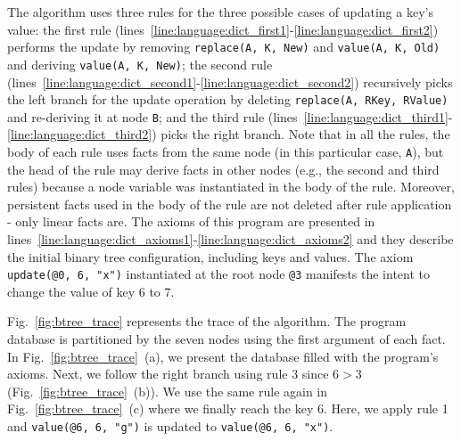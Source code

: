 The algorithm uses three rules for the three possible cases of updating a key's
value: the first rule
(lines~\ref{line:language:dict_first1}-\ref{line:language:dict_first2}) performs
the update by removing \texttt{replace(A, K, New)} and \texttt{value(A, K, Old)}
and deriving \texttt{value(A, K, New)}; the second rule
(lines~\ref{line:language:dict_second1}-\ref{line:language:dict_second2})
recursively picks the left branch for the update operation by deleting
\texttt{replace(A, RKey, RValue)} and re-deriving it at node \texttt{B}; and the
third rule
(lines~\ref{line:language:dict_third1}-\ref{line:language:dict_third2}) picks
the right branch. Note that in all the rules, the body of each rule uses facts
from the same node (in this particular case, \texttt{A}), but the head of the
rule may derive facts in other nodes (e.g., the second and third rules) because
a node variable was instantiated in the body of the rule. Moreover, persistent
facts used in the body of the rule are not deleted after rule application - only
linear facts are. The axioms of this program are presented in
lines~\ref{line:language:dict_axioms1}-\ref{line:language:dict_axioms2} and they
describe the initial binary tree configuration, including keys and values.  The
axiom \texttt{update(@0, 6, "x")} instantiated at the root node \texttt{@3}
manifests the intent to change the value of key 6 to 7.

Fig.~\ref{fig:btree_trace} represents the trace of the algorithm. The program
database is partitioned by the seven nodes using the first argument of each
fact. In Fig.~\ref{fig:btree_trace}~(a), we present the database filled with the
program's axioms. Next, we follow the right branch using rule 3 since $6 > 3$
(Fig.~\ref{fig:btree_trace}~(b)).  We use the same rule again in
Fig.~\ref{fig:btree_trace}~(c) where we finally reach the key 6. Here, we apply
rule 1 and \texttt{value(@6, 6, "g")} is updated to \texttt{value(@6, 6, "x")}.

